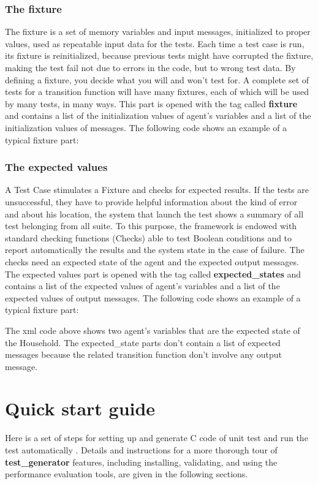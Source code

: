 \documentclass[a4paper,10pt]{article}
\begin{document}
\subsubsection{The fixture}
The fixture is a set of memory variables and input messages, initialized to proper values, used
as repeatable input data for the tests. Each time a test case is run, its fixture is
reinitialized, because previous tests might have corrupted the fixture, making
the test fail not due to errors in the code, but to wrong test data. By defining
a fixture, you decide what you will and won't test for. A complete set of tests
for a transition function  will have many fixtures, each of which will be used by many tests,
in many ways.
This part is opened with the tag called \textbf{fixture} and contains a  list of the initialization values of agent's variables and a list of the initialization values of messages.
The following code shows an example of a typical fixture part:

\subsubsection{The expected values}
A Test Case stimulates a Fixture and checks for expected
results. If the tests are unsuccessful, they have to provide helpful information
about the kind of error and about his location, the system that launch the test shows a summary of all test belonging from all suite. To this purpose,
the framework is endowed with standard checking functions (Checks)
able to test Boolean conditions and to report automatically the results
and the system state in the case of failure. 
The checks need an expected state of the agent and the expected output messages. The expected values part is opened with the tag called \textbf{expected\_states} and contains a  list of the expected values of agent's variables and a list of the expected values of output messages.
The following code shows an example of a typical fixture part: 

The xml code above shows two agent's variables that are the expected state of the Household. The expected\_state parts don't contain a list of expected messages because the related transition function don't involve any output message.

\section{Quick start guide}
Here is a set of steps for setting up and generate C code of unit test and run the test automatically . Details and instructions for
a more thorough tour of \textbf{test\_generator}  features, including installing, validating,
and using the performance evaluation tools, are given in the following sections. 
\end{document}
